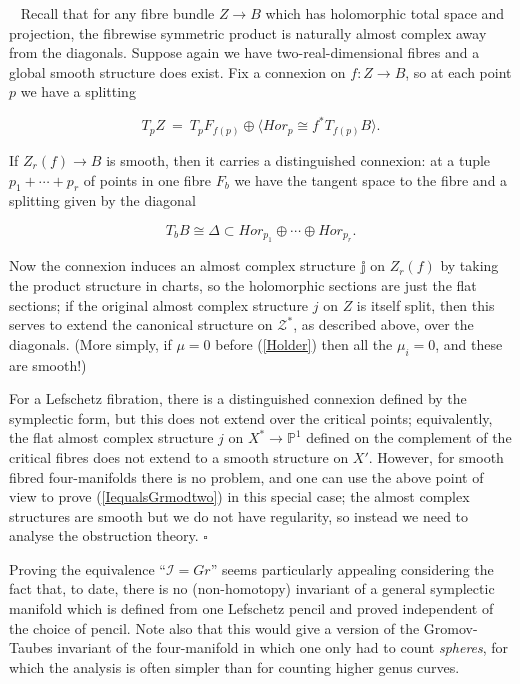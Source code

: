 \documentclass[10pt]{article}
\newcommand{\pp}{\mathbb{P}}
\newcounter{Universal}[section]
\renewcommand{\theUniversal}{\thesection.\arabic{Universal}}
\newenvironment{Plain}{\refstepcounter{Universal} \par \vspace{0.5cm}
\noindent {\bf (\theUniversal)}\ }{\par \vspace{0.5cm}}
\newenvironment{Rmk}{\begin{Plain} \noindent{\sc Remark: }}{\quad
    $\square$ \end{Plain}}
\begin{document}
\begin{Rmk} Recall that for any fibre bundle $Z \rightarrow B$ which has
holomorphic total space and projection, the fibrewise symmetric
product is naturally almost complex away from the diagonals.
Suppose again we have two-real-dimensional fibres and a global smooth
structure does exist.  Fix a connexion on
$f:Z \rightarrow B$, so at each point $p$ we have a splitting

$$T_p Z \ = \ T_p F_{f(p)} \oplus \langle Hor_p \cong f^* T_{f(p)}B \rangle.$$

\noindent If $Z_r(f) \rightarrow B$ is smooth, then it carries a
distinguished connexion: at a tuple $p_1 + \cdots + p_r$ of points in
one fibre $F_b$ we have the
tangent space to the fibre and a splitting given by the diagonal

$$T_b B \cong \Delta \subset Hor_{p_1} \oplus \cdots \oplus Hor_{p_r}.$$

\noindent Now the connexion induces an almost complex structure
$\mathbb{j}$ on $Z_r(f)$ by taking the product structure in charts, so
the holomorphic sections are just the flat sections;  if the original
almost complex structure $j$ on $Z$ is itself split, then this serves
to extend the canonical structure on $\mathcal{Z}^*$, as described
above, over the diagonals.  (More simply, if $\mu = 0$ before
(\ref{Holder}) then all the $\mu_i = 0$, and these are smooth!)

\vspace{0.2cm}

\noindent For a Lefschetz fibration, there is a distinguished
connexion defined by the symplectic form, but this does not extend
over the critical points;  equivalently, the flat almost complex structure
$j$ on $X^* \rightarrow \pp^1$ defined on the complement of the
critical fibres does not extend to a smooth structure on $X'$.
However, for smooth fibred four-manifolds there is no problem, and one
can use the above point of view to prove (\ref{IequalsGrmodtwo}) in
this special case; the almost complex structures are smooth but
we do not have regularity, so instead we need to analyse the
obstruction theory.
\end{Rmk}

\noindent Proving the equivalence ``$\mathcal{I} = Gr$''
seems particularly appealing considering the fact
that, to date, there is no (non-homotopy) invariant of a general
symplectic manifold which is defined from one Lefschetz pencil and
proved independent of the choice of pencil.  Note also that this would
give a version of the Gromov-Taubes invariant of the four-manifold in
which one only had to count \emph{spheres}, for which the analysis is
often simpler than for counting higher genus curves.
\end{document}
